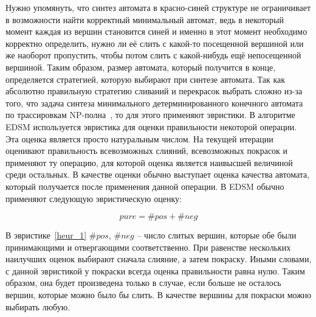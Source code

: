 \documentclass[times,specification,annotation]{itmo-student-thesis}
\begin{document}
Нужно упомянуть, что синтез автомата в красно-синей структуре не ограничивает в возможности найти корректный минимальный автомат, ведь в некоторый момент каждая из вершин становится
синей и именно в этот момент необходимо корректно определить, нужно ли её слить с какой-то посещенной вершиной или же наоборот пропустить, чтобы потом слить с какой-нибудь
ещё непосещенной вершиной. Таким образом, размер автомата, который получится в конце, определяется стратегией, которую выбирают при синтезе автомата.
Так как абсолютно правильную стратегию сливаний и перекрасок выбрать сложно из-за того, что задача синтеза минимального детерминированного конечного автомата по трассировкам 
NP-полна~\cite{dfa-completeness}, то для этого применяют эвристики. В алгоритме EDSM используется эвристика для оценки правильности некоторой операции. Эта оценка является просто натуральным
числом. На текущей итерации оценивают правильность всевозможных слияний, всевозможных покрасок и применяют ту операцию, для которой оценка является наивысшей величиной среди остальных.
В качестве оценки обычно выступает оценка качества автомата, который получается после применения данной операции.
В EDSM обычно применяют следующую эвристическую оценку:

\begin{equation}
  pure = \#pos + \#neg
  \label{heur_1}
\end{equation}

В эвристике~\ref{heur_1} $\#pos$, $\#neg$ -- число слитых вершин, которые обе были принимающими и отвергающими соответственно. При равенстве нескольких наилучших оценок выбирают сначала
слияние, а затем покраску. Иными словами, с данной эвристикой у покраски всегда оценка правильности равна нулю. Таким образом, она будет произведена только в случае, 
если больше не осталось вершин, которые можно было бы слить. В качестве вершины для покраски можно выбирать любую.
\end{document}
